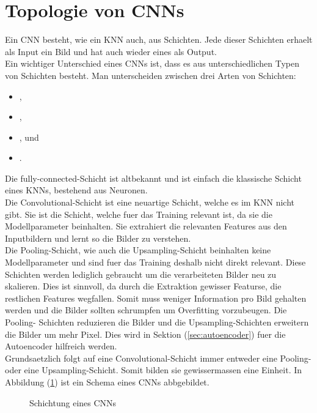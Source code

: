 \section{Topologie von CNNs}
Ein CNN besteht, wie ein KNN auch, aus Schichten. Jede dieser Schichten erhaelt
als Input ein Bild und hat auch wieder eines als Output. \\
Ein wichtiger Unterschied eines CNNs ist, dass es aus unterschiedlichen Typen von
Schichten besteht. Man unterscheiden zwischen drei Arten von Schichten:
\begin{itemize}
\item{,}
\item{,}
\item{, und}
\item{.}
\end{itemize}
Die fully-connected-Schicht ist altbekannt und ist einfach die klassische Schicht
eines KNNs, bestehend aus Neuronen. \\
Die Convolutional-Schicht ist eine neuartige Schicht, welche es im KNN nicht
gibt. Sie ist die Schicht, welche fuer das Training relevant ist,
da sie die Modellparameter beinhalten. Sie extrahiert die relevanten Features
aus den Inputbildern und lernt so die Bilder zu verstehen. \\
Die Pooling-Schicht, wie auch die Upsampling-Schicht beinhalten keine
Modellparameter und sind fuer das Training deshalb nicht direkt relevant.
Diese Schichten werden lediglich gebraucht um die verarbeiteten Bilder neu zu
skalieren. Dies ist sinnvoll, da durch die Extraktion gewisser Featurse, die
restlichen Features wegfallen. Somit muss weniger Information pro Bild gehalten
werden und die Bilder sollten schrumpfen um Overfitting vorzubeugen. Die Pooling-
Schichten reduzieren die Bilder und die Upsampling-Schichten erweitern die
Bilder um mehr Pixel. Dies wird in Sektion (\ref{sec:autoencoder}) fuer die Autoencoder
hilfreich werden. \\
Grundsaetzlich folgt auf eine Convolutional-Schicht immer entweder eine Pooling-
oder eine Upsampling-Schicht. Somit bilden sie gewissermassen eine Einheit.
\para{}
In Abbildung (\ref{fig:cnn_topology}) ist ein Schema eines CNNs abbgebildet.
\begin{figure}[h!]

  \caption{Schichtung eines CNNs}
  \label{fig:cnn_topology}
\end{figure}



